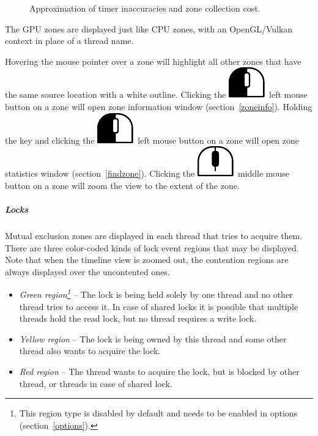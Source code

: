 \documentclass[hidelinks,titlepage,a4paper]{article}
\newcommand{\LMB}{\includegraphics[height=.8\baselineskip]{icons/lmb}}
\newcommand{\MMB}{\includegraphics[height=.8\baselineskip]{icons/mmb}}
\begin{document}
\begin{figure}[h]
\centering{}
\caption{Approximation of timer inaccuracies and zone collection cost.}
\label{inaccuracy}
\end{figure}

The GPU zones are displayed just like CPU zones, with an OpenGL/Vulkan context in place of a thread name.

Hovering the \faMousePointer{} mouse pointer over a zone will highlight all other zones that have the same source location with a white outline. Clicking the \LMB{}~left mouse button on a zone will open zone information window (section~\ref{zoneinfo}). Holding the \keys{\ctrl} key and clicking the \LMB{}~left mouse button on a zone will open zone statistics window (section~\ref{findzone}). Clicking the \MMB{}~middle mouse button on a zone will zoom the view to the extent of the zone.

\subparagraph{Locks}

Mutual exclusion zones are displayed in each thread that tries to acquire them. There are three color-coded kinds of lock event regions that may be displayed. Note that when the timeline view is zoomed out, the contention regions are always displayed over the uncontented ones.

\begin{itemize}
\item \emph{Green region\footnote{This region type is disabled by default and needs to be enabled in options (section~\ref{options}).}} -- The lock is being held solely by one thread and no other thread tries to access it. In case of shared locks it is possible that multiple threads hold the read lock, but no thread requires a write lock.
\item \emph{Yellow region} -- The lock is being owned by this thread and some other thread also wants to acquire the lock.
\item \emph{Red region} -- The thread wants to acquire the lock, but is blocked by other thread, or threads in case of shared lock.
\end{itemize}
\end{document}

